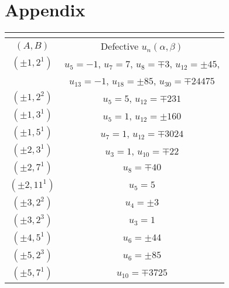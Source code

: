 \documentclass[12pt]{amsart}
\numberwithin{equation}{section}
\begin{document}
\section{Appendix}
\begingroup
\setlength{\tabcolsep}{3pt} 
\renewcommand{\arraystretch}{1.5}
\begin{center} 
\begin{table}[!ht]
\begin{tabular}{|c|c|}
\multicolumn{2}{c}{} \\ \hline
$(A,B)$ & Defective $u_n(\alpha, \beta)$ \\ 
\hline
\hline
$(\pm 1,2^1)$ & $u_5 = -1$, $u_7 = 7$, $u_8 = \mp 3$, $u_{12} = \pm 45$, \\ & $u_{13} = -1$, $u_{18} = \pm 85$, $u_{30} = \mp 24475$ \\ \hline
$(\pm 1,2^2)$ & $u_5 = 5$, $u_{12} = \mp 231$ \\ \hline
$(\pm 1,3^1)$ & $u_5 = 1$, $u_{12} = \pm 160$ \\ \hline
$(\pm 1, 5^1)$ & $u_7 = 1$, $u_{12} = \mp 3024$ \\ \hline
$(\pm 2, 3^1)$ & $u_3 = 1$, $u_{10} = \mp 22$ \\ \hline
$(\pm 2,7^1)$ & $u_8 = \mp 40$ \\ \hline
$(\pm 2, 11^1)$ & $u_5 = 5$ \\ \hline
$(\pm 3, 2^2)$ & $u_4=\pm3$ \\ \hline
$(\pm 3, 2^3)$ & $u_3 = 1$ \\ \hline
$(\pm 4, 5^1)$ & $u_6=\pm 44$\\ \hline
$(\pm 5, 2^3)$ & $u_6 = \pm 85$ \\ \hline
$(\pm 5, 7^1)$ & $u_{10} = \mp 3725$ \\ \hline
\end{tabular}
\label{table1}
\end{table}
\end{center}
\endgroup
\end{document}
